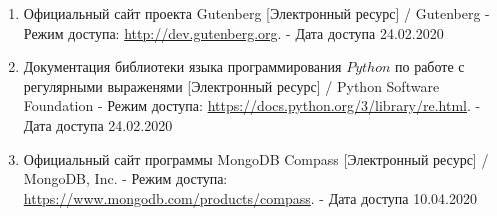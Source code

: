 \begin{enumerate}
    \item \label{itm:gutenberg} Официальный сайт проекта Gutenberg [Электронный ресурс] / Gutenberg - Режим доступа: \url{http://dev.gutenberg.org}. - Дата доступа 24.02.2020

    \item \label{itm:regexp} Документация библиотеки языка программирования $Python$ по работе с регулярными выраженями [Электронный ресурс] / Python Software Foundation - Режим доступа: \url{https://docs.python.org/3/library/re.html}. - Дата доступа 24.02.2020

    \item \label{itm:compass} Официальный сайт программы MongoDB Compass [Электронный ресурс] / MongoDB, Inc. - Режим доступа: \url{https://www.mongodb.com/products/compass}. - Дата доступа 10.04.2020
\end{enumerate}

\newpage
